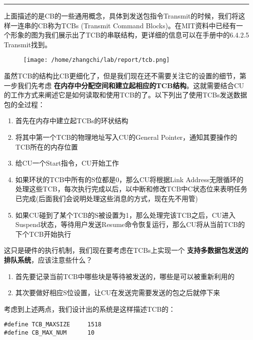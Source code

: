 \documentclass{article}
\newcommand{\highlight}[1]{{\bfseries \color{red}  #1}}
\begin{document}
\begin{CJK*}{UTF8}{gkai}
\vspace{2em}
\hrule
\vspace{2em}


上面描述的是CB的一些通用概念，具体到发送包指令Transmit的时候，我们将这样一连串的CB称为TCBs (Transmit Command Blocks)。在MIT资料中已经有一个形象的图为我们展示出了TCB的串联结构，更详细的信息可以在手册中的6.4.2.5 Transmit找到。

\begin{figure}[htp]
\centering
\texttt{[image: /home/zhangchi/lab/report/tcb.png]}
\end{figure}

虽然TCB的结构比CB更细化了，但是我们现在还不需要关注它的设置的细节，第一步我们先考虑\highlight{在内存中分配空间和建立起相应的TCB结构}。这就需要结合CU的工作方式来阐述它是如何读取和使用TCB的了。以下列出了使用TCBs发送数据包的全过程：

\begin{enumerate}
\item{首先在内存中建立起TCBs的环状结构}
\item{将其中第一个TCB的物理地址写入CU的General Pointer，通知其要操作的TCB所在的内存位置}
\item{给CU一个Start指令，CU开始工作}
\item{如果环状的TCB中所有的S位都是0，那么CU将根据Link Address无限循环的处理这些TCB，每次执行完成以后，以中断和修改TCB中C状态位来表明任务已完成(后面我们会说明处理这些消息的方式，现在先不用管)}
\item{如果CU碰到了某个TCB的S被设置为1，那么处理完该TCB之后，CU进入Suspend状态，等待用户发送Resume命令恢复运行，那么CU将从当前TCB的下个TCB开始执行}
\end{enumerate}


这只是硬件的执行机制，我们现在要考虑在TCBs上实现一个\highlight{支持多数据包发送的排队系统}，应该注意些什么？

\begin{enumerate}
\item{首先要记录当前TCB中哪些块是等待被发送的，哪些是可以被重新利用的}
\item{其次要做好相应S位设置，让CU在发送完需要发送的包之后就停下来}
\end{enumerate}

考虑到上述两点，我们设计出的系统是这样描述TCB的：

\begin{lstlisting}[style=ccode, title={\scriptsize \ttfamily \bfseries kern/e100.h}]
#define TCB_MAXSIZE     1518
#define CB_MAX_NUM      10


\end{lstlisting}
\end{CJK*}
\end{document}
